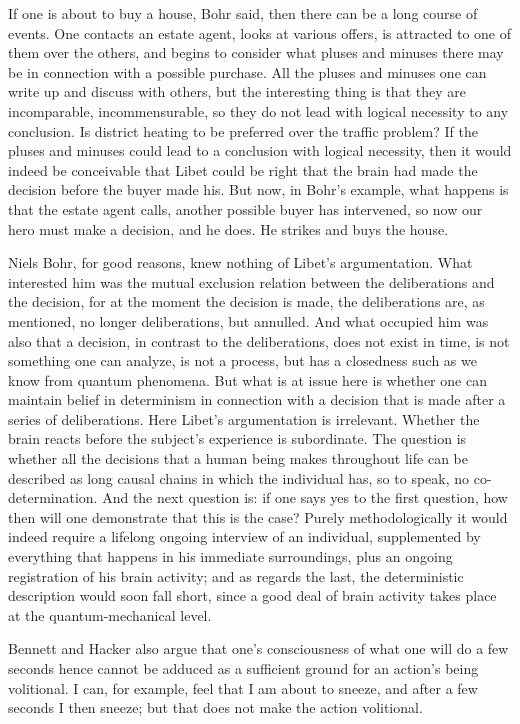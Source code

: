 \documentclass[12pt,a4paper]{book}
\begin{document}
If one is about to buy a house, Bohr said, then there can be a long course of events. One contacts an estate agent, looks at various offers, is attracted to one of them over the others, and begins to consider what pluses and minuses there may be in connection with a possible purchase. All the pluses and minuses one can write up and discuss with others, but the interesting thing is that they are incomparable, incommensurable, so they do not lead with logical necessity to any conclusion. Is district heating to be preferred over the traffic problem? If the pluses and minuses could lead to a conclusion with logical necessity, then it would indeed be conceivable that Libet could be right that the brain had made the decision before the buyer made his. But now, in Bohr's example, what happens is that the estate agent calls, another possible buyer has intervened, so now our hero must make a decision, and he does. He strikes and buys the house.

Niels Bohr, for good reasons, knew nothing of Libet's argumentation. What interested him was the mutual exclusion relation between the deliberations and the decision, for at the moment the decision is made, the deliberations are, as mentioned, no longer deliberations, but annulled. And what occupied him was also that a decision, in contrast to the deliberations, does not exist in time, is not something one can analyze, is not a process, but has a closedness such as we know from quantum phenomena. But what is at issue here is whether one can maintain belief in determinism in connection with a decision that is made after a series of deliberations. Here Libet's argumentation is irrelevant. Whether the brain reacts before the subject's experience is subordinate. The question is whether all the decisions that a human being makes throughout life can be described as long causal chains in which the individual has, so to speak, no co-determination. And the next question is: if one says yes to the first question, how then will one demonstrate that this is the case? Purely methodologically it would indeed require a lifelong ongoing interview of an individual, supplemented by everything that happens in his immediate surroundings, plus an ongoing registration of his brain activity; and as regards the last, the deterministic description would soon fall short, since a good deal of brain activity takes place at the quantum-mechanical level.

Bennett and Hacker also argue that one's consciousness of what one will do a few seconds hence cannot be adduced as a sufficient ground for an action's being volitional. I can, for example, feel that I am about to sneeze, and after a few seconds I then sneeze; but that does not make the action volitional.
\end{document}
